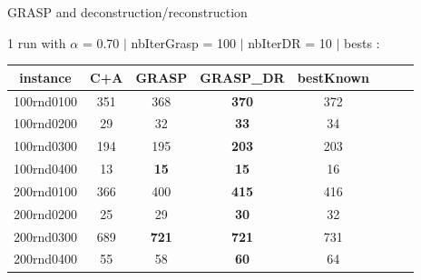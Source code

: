 \documentclass[10pt,xcolor=dvipsnames]{beamer}
\begin{document}
\begin{frame}{GRASP and deconstruction/reconstruction}

   1 run with 
    $\alpha$       = 0.70  $\mid$
    nbIterGrasp = 100 $\mid$
    nbIterDR     = 10  $\mid$
    bests :

{\scriptsize
\begin{center}
\begin{tabular}{|c|c|c|c|c|r|c|c|}
\hline
instance & C+A & GRASP & GRASP\_DR  & bestKnown\\
\hline
 100rnd0100 & 351 & 368 & \textbf{370} & 372  \\
 100rnd0200 & 29 & 32 & \textbf{33} & 34    \\
 100rnd0300 & 194 & 195 & \textbf{203} & 203   \\
 100rnd0400 & 13 & \textbf{15} & \textbf{15} & 16    \\
\hline
 200rnd0100 & 366 & 400 & \textbf{415} & 416   \\
 200rnd0200 & 25 & 29 & \textbf{30} & 32   \\
 200rnd0300 & 689 & \textbf{721} & \textbf{721} & 731   \\
 200rnd0400 & 55 & 58 & \textbf{60} & 64    \\

\end{tabular}
\end{center}}
\end{frame}
\end{document}
